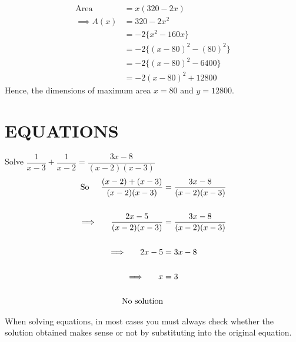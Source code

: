\documentclass[11pt,a4paper]{article}
\begin{document}
\begin{align*}
\text{Area} & = x(320-2x)\\
\implies A(x) & = 320-2x^2\\
              & = -2\{x^2-160x\}\\
              & = -2\{(x-80)^2-(80)^2\}\\
              & = -2\{(x-80)^2-6400\}\\
              & = -2(x-80)^2+12800
\end{align*}
Hence, the dimensions of maximum area $x=80$ and $y=12800$.\\



















\pagebreak
\section{EQUATIONS}
Solve $\dfrac{1}{x-3}+\dfrac{1}{x-2}=\dfrac{3x-8}{(x-2)(x-3)}$\\

\begin{align*}
\text{So}\hspace{0.5cm} \frac{(x-2)+(x-3)}{(x-2)(x-3)} & = \frac{3x-8}{(x-2)(x-3)}\\\\
\implies \hspace{0.5cm} \frac{2x-5}{(x-2)(x-3)} & = \frac{3x-8}{(x-2)(x-3)}\\\\
\implies \hspace{0.5cm} 2x-5 & = 3x-8\\\\
\implies \hspace{0.5cm} x & = 3\\\\ \hspace{0.5cm} \text{No solution}\\
\end{align*}

When solving equations, in most cases you must always check whether the solution obtained makes sense or not by substituting into the original equation.\\\\
\end{document}
